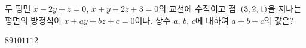 두 평면 $x-2y+z=0$, $x+y-2z+3=0$의 교선에 수직이고 점~$(3{,}\mkern3mu\mathopen{}2{,}\mkern3mu\mathopen{}1)$을 지나는 평면의 방정식이 $x+ay+bz+c=0$이다. 상수 $a$, $b$, $c$에 대하여 $a+b-c$의 값은?
\begin{choices32}{$8$}{$9$}{$10$}{$11$}{$12$}\end{choices32}
